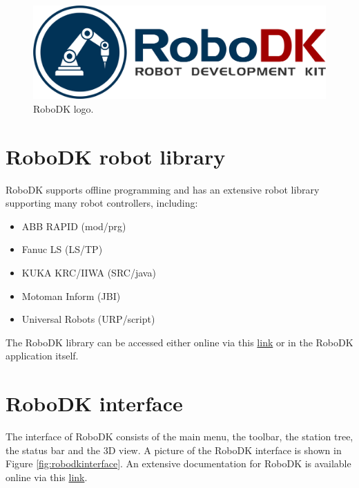 \begin{figure}[h]
    \centering
    \includegraphics[width=0.6\linewidth]{img/robodk_logo.png}
    \caption{RoboDK logo.}
    \label{fig:robodklogo}
\end{figure}

\section{RoboDK robot library}

RoboDK supports offline programming and has an extensive robot library supporting many robot controllers, including:

\begin{itemize}
    \item ABB RAPID (mod/prg)
    \item Fanuc LS (LS/TP)
    \item KUKA KRC/IIWA (SRC/java)
    \item Motoman Inform (JBI)
    \item Universal Robots (URP/script)
\end{itemize}

The RoboDK library can be accessed either online via this \href{https://en.etsmtl.ca/unites-de-recherche/coro/accueil?lang=en-CA}{link}  or in the RoboDK application itself. 



\section{RoboDK interface}

The interface of RoboDK consists of the main menu, the toolbar, the station tree, the status bar and the 3D view. A picture of the RoboDK interface is shown in Figure \ref{fig:robodkinterface}. An extensive documentation for RoboDK is available online via this \href{https://robodk.com/doc/en/Basic-Guide.html#Start}{link}.

